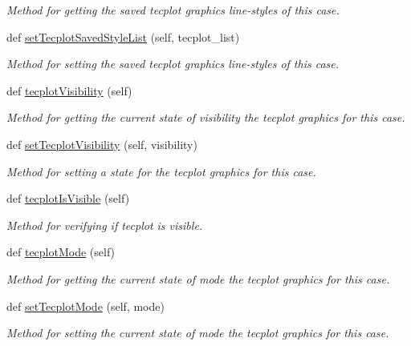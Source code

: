 \begin{DoxyCompactItemize}
\begin{DoxyCompactList}\small\item\em Method for getting the saved tecplot graphics line-\/styles of this case. \end{DoxyCompactList}\item 
def \hyperlink{classdata__structure_1_1case__node_1_1_case_node_aca41f53412a5bfdc6e3ced0ddaf3d2b3}{set\+Tecplot\+Saved\+Style\+List} (self, tecplot\+\_\+list)
\begin{DoxyCompactList}\small\item\em Method for setting the saved tecplot graphics line-\/styles of this case. \end{DoxyCompactList}\item 
def \hyperlink{classdata__structure_1_1case__node_1_1_case_node_aeb90281663e7094357befb23383a0d12}{tecplot\+Visibility} (self)
\begin{DoxyCompactList}\small\item\em Method for getting the current state of visibility the tecplot graphics for this case. \end{DoxyCompactList}\item 
def \hyperlink{classdata__structure_1_1case__node_1_1_case_node_a7bf258efc68a0aa850fd68d937b54d44}{set\+Tecplot\+Visibility} (self, visibility)
\begin{DoxyCompactList}\small\item\em Method for setting a state for the tecplot graphics for this case. \end{DoxyCompactList}\item 
def \hyperlink{classdata__structure_1_1case__node_1_1_case_node_adf31e8bf3222b4c310e652a08fa4cbb5}{tecplot\+Is\+Visible} (self)
\begin{DoxyCompactList}\small\item\em Method for verifying if tecplot is visible. \end{DoxyCompactList}\item 
def \hyperlink{classdata__structure_1_1case__node_1_1_case_node_aed14e2af89b145c93189f2e13b3520f9}{tecplot\+Mode} (self)
\begin{DoxyCompactList}\small\item\em Method for getting the current state of mode the tecplot graphics for this case. \end{DoxyCompactList}\item 
def \hyperlink{classdata__structure_1_1case__node_1_1_case_node_a18f8a870b09f2ec7c25bde6da6ad4d77}{set\+Tecplot\+Mode} (self, mode)
\begin{DoxyCompactList}\small\item\em Method for setting the current state of mode the tecplot graphics for this case. \end{DoxyCompactList}\item 

\end{DoxyCompactItemize}
